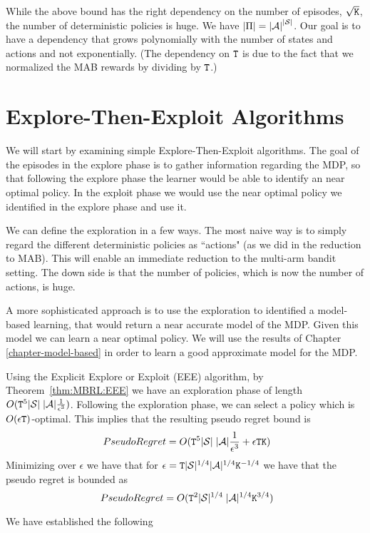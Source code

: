 While the above bound has the right dependency on the number of episodes, $\sqrt{{\tt K}}$, the number of deterministic policies is huge. We have $|\Pi|={|\mathcal{A}|}^{|\mathcal{S}|}$. Our goal is to have a dependency that grows polynomially with the number of states and actions and not exponentially.
(The dependency on ${\tt T}$ is due to the fact that we normalized the MAB rewards by dividing by ${\tt T}$.)


\section{Explore-Then-Exploit Algorithms}

We will start by examining simple Explore-Then-Exploit algorithms.
The goal of the episodes in the explore phase is to gather information regarding the MDP, so that following the explore phase the learner would be able to identify an near optimal policy. In the exploit phase we would use the near optimal policy we identified in the explore phase and use it.

We can define the exploration in a few ways. The most naive way is to simply regard the different deterministic policies as ``actions" (as we did in the reduction to MAB). This will enable an immediate reduction to the multi-arm bandit setting. The down side is that the number of policies, which is now the number of actions, is huge.

A more sophisticated approach is to use the exploration to identified a model-based learning, that would return a near accurate model of the MDP. Given this model we can learn a near optimal policy. We will use the results of Chapter \ref{chapter-model-based} in order to learn a good approximate model for the MDP.

Using the Explicit Explore or Exploit (EEE) algorithm, by  Theorem~\ref{thm:MBRL:EEE} we have an exploration phase of length $O({\tt T}^5 |\mathcal{S}|\;|\mathcal{A}|\frac{1}{\epsilon^3})$. Following the exploration phase, we can select a policy which is $O(\epsilon{\tt T})$-optimal.
This implies that the resulting pseudo regret bound is
\[\
PseudoRegret=O( {\tt T}^5 |\mathcal{S}|\;|\mathcal{A}|\frac{1}{\epsilon^3}+\epsilon{\tt T}{\tt K})
\]
Minimizing over $\epsilon$ we have that for $\epsilon={\tt T} |\mathcal{S}|^{1/4}|\mathcal{A}|^{1/4} {\tt K}^{-1/4}$ we have that the pseudo regret is bounded as 
\[\
PseudoRegret=O( {\tt T}^2 |\mathcal{S}|^{1/4}\;|\mathcal{A}|^{1/4}{\tt K}^{3/4})
\]

We have established the following

